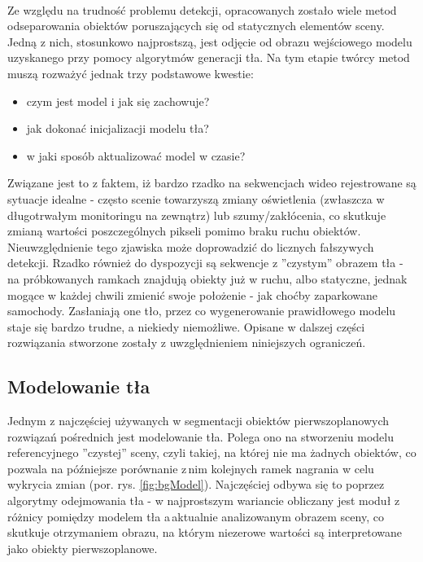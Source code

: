 \paragraph{}
Ze względu na trudność problemu detekcji, opracowanych zostało wiele metod odseparowania obiektów poruszających się od statycznych elementów sceny. Jedną z nich, stosunkowo najprostszą, jest odjęcie od obrazu wejściowego modelu uzyskanego przy pomocy algorytmów generacji tła. Na tym etapie twórcy metod muszą rozważyć jednak trzy podstawowe kwestie:
\begin{itemize}
\item czym jest model i jak się zachowuje?
\item jak dokonać inicjalizacji modelu tła?
\item w jaki sposób aktualizować model w czasie?
\end{itemize}
Związane jest to z faktem, iż bardzo rzadko na sekwencjach wideo rejestrowane są sytuacje idealne - często scenie towarzyszą zmiany oświetlenia (zwłaszcza w długotrwałym monitoringu na zewnątrz) lub szumy/zakłócenia, co skutkuje zmianą wartości poszczególnych pikseli pomimo braku ruchu obiektów. Nieuwzględnienie tego zjawiska może doprowadzić do licznych fałszywych detekcji. Rzadko również do dyspozycji są sekwencje z ''czystym'' obrazem tła - na próbkowanych ramkach znajdują obiekty już w ruchu, albo statyczne, jednak mogące w każdej chwili zmienić swoje położenie - jak choćby zaparkowane samochody. Zasłaniają one tło, przez co wygenerowanie prawidłowego modelu staje się bardzo trudne, a niekiedy niemożliwe. Opisane w dalszej części rozwiązania stworzone zostały z uwzględnieniem niniejszych ograniczeń.
\subsection{Modelowanie tła}
Jednym z najczęściej używanych w segmentacji obiektów pierwszoplanowych rozwiązań pośrednich jest modelowanie tła. Polega ono na stworzeniu modelu referencyjnego ''czystej'' sceny, czyli takiej, na której nie ma żadnych obiektów, co pozwala na późniejsze porównanie z\,nim kolejnych ramek nagrania w celu wykrycia zmian (por. rys. \ref{fig:bgModel}). Najczęściej odbywa się to poprzez algorytmy odejmowania tła - w najprostszym wariancie obliczany jest moduł z różnicy pomiędzy modelem tła a\,aktualnie analizowanym obrazem sceny, co skutkuje otrzymaniem obrazu, na którym niezerowe wartości są interpretowane jako obiekty pierwszoplanowe.
